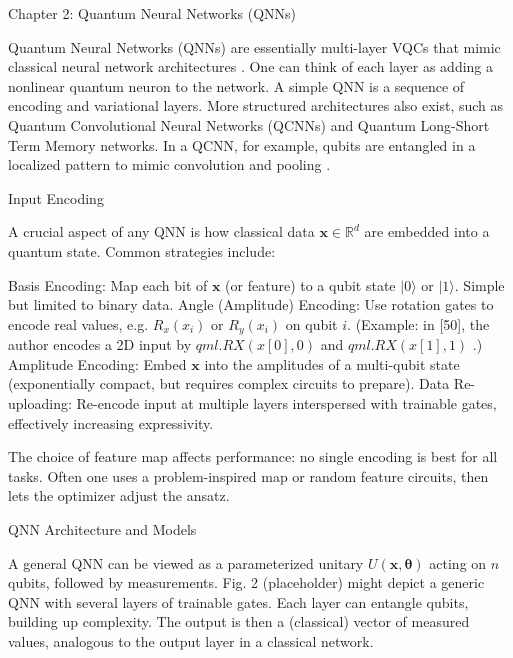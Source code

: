 Chapter 2: Quantum Neural Networks (QNNs)





Quantum Neural Networks (QNNs) are essentially multi-layer VQCs that mimic classical neural network architectures .  One can think of each layer as adding a nonlinear quantum neuron to the network.  A simple QNN is a sequence of encoding and variational layers.  More structured architectures also exist, such as Quantum Convolutional Neural Networks (QCNNs) and Quantum Long-Short Term Memory networks.  In a QCNN, for example, qubits are entangled in a localized pattern to mimic convolution and pooling .





Input Encoding





A crucial aspect of any QNN is how classical data $\mathbf{x}\in\mathbb{R}^d$ are embedded into a quantum state.  Common strategies include:



Basis Encoding: Map each bit of $\mathbf{x}$ (or feature) to a qubit state $|0\rangle$ or $|1\rangle$. Simple but limited to binary data.
Angle (Amplitude) Encoding: Use rotation gates to encode real values, e.g. $R_x(x_i)$ or $R_y(x_i)$ on qubit $i$.  (Example: in [50], the author encodes a 2D input by $qml.RX(x[0],0)$ and $qml.RX(x[1],1)$ .)
Amplitude Encoding: Embed $\mathbf{x}$ into the amplitudes of a multi-qubit state (exponentially compact, but requires complex circuits to prepare).
Data Re-uploading: Re-encode input at multiple layers interspersed with trainable gates, effectively increasing expressivity.




The choice of feature map affects performance: no single encoding is best for all tasks.  Often one uses a problem-inspired map or random feature circuits, then lets the optimizer adjust the ansatz.





QNN Architecture and Models





A general QNN can be viewed as a parameterized unitary $U(\mathbf{x},\boldsymbol\theta)$ acting on $n$ qubits, followed by measurements.  Fig. 2 (placeholder) might depict a generic QNN with several layers of trainable gates. Each layer can entangle qubits, building up complexity. The output is then a (classical) vector of measured values, analogous to the output layer in a classical network.



